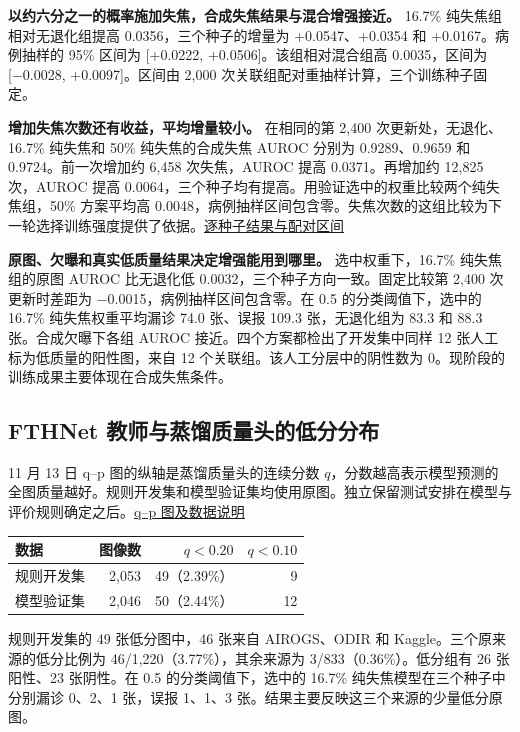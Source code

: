 \documentclass[
  11pt,
]{article}
\newcounter{none} %
\begin{document}
\textbf{以约六分之一的概率施加失焦，合成失焦结果与混合增强接近。} 16.7\%
纯失焦组相对无退化组提高 0.0356，三个种子的增量为 +0.0547、+0.0354 和
+0.0167。病例抽样的 95\% 区间为 {[}+0.0222, +0.0506{]}。该组相对混合组高
0.0035，区间为 {[}−0.0028, +0.0097{]}。区间由 2,000
次关联组配对重抽样计算，三个训练种子固定。

\textbf{增加失焦次数还有收益，平均增量较小。} 在相同的第 2,400
次更新处，无退化、16.7\% 纯失焦和 50\% 纯失焦的合成失焦 AUROC 分别为
0.9289、0.9659 和 0.9724。前一次增加约 6,458 次失焦，AUROC 提高
0.0371。再增加约 12,825 次，AUROC 提高
0.0064，三个种子均有提高。用验证选中的权重比较两个纯失焦组，50\%
方案平均高
0.0048，病例抽样区间包含零。失焦次数的这组比较为下一轮选择训练强度提供了依据。\href{completed-matched-defocus.json}{逐种子结果与配对区间}

\textbf{原图、欠曝和真实低质量结果决定增强能用到哪里。}
选中权重下，16.7\% 纯失焦组的原图 AUROC 比无退化低
0.0032，三个种子方向一致。固定比较第 2,400 次更新时差距为
−0.0015，病例抽样区间包含零。在 0.5 的分类阈值下，选中的 16.7\%
纯失焦权重平均漏诊 74.0 张、误报 109.3 张，无退化组为 83.3 和 88.3
张。合成欠曝下各组 AUROC 接近。四个方案都检出了开发集中同样 12
张人工标为低质量的阳性图，来自 12 个关联组。该人工分层中的阴性数为
0。现阶段的训练成果主要体现在合成失焦条件。

\newpage
\subsection{FTHNet
教师与蒸馏质量头的低分分布}\label{fthnet-ux6559ux5e08ux4e0eux84b8ux998fux8d28ux91cfux5934ux7684ux4f4eux5206ux5206ux5e03}

11 月 13 日 q--p 图的纵轴是蒸馏质量头的连续分数
\(q\)，分数越高表示模型预测的全图质量越好。规则开发集和模型验证集均使用原图。独立保留测试安排在模型与评价规则确定之后。\href{../2026-11-13/progress-overview.zh.md}{q--p
图及数据说明}

{\def\LTcaptype{none} %
\begin{longtable}[]{@{}lrrr@{}}
\toprule\noalign{}
数据 & 图像数 & \(q<0.20\) & \(q<0.10\) \\
\midrule\noalign{}
\endhead
\bottomrule\noalign{}
\endlastfoot
规则开发集 & 2,053 & 49（2.39\%） & 9 \\
模型验证集 & 2,046 & 50（2.44\%） & 12 \\
\end{longtable}
}

规则开发集的 49 张低分图中，46 张来自 AIROGS、ODIR 和
Kaggle。三个原来源的低分比例为 46/1,220（3.77\%），其余来源为
3/833（0.36\%）。低分组有 26 张阳性、23 张阴性。在 0.5
的分类阈值下，选中的 16.7\% 纯失焦模型在三个种子中分别漏诊 0、2、1
张，误报 1、1、3 张。结果主要反映这三个来源的少量低分原图。
\end{document}
